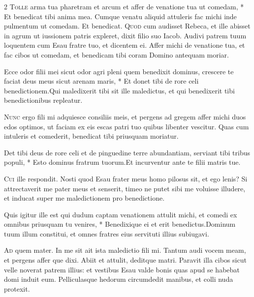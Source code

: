 \begin{multicols*}{2}
\lettrine[lines=2]{\zallmancaps \color{Red} T}{olle} \hypertarget{tolle-arma}{\label{tolle-arma}} arma tua pharetram et arcum et affer de venatione tua ut comedam, * Et benedicat tibi anima mea. \V Cumque venatu aliquid attuleris fac michi inde pulmentum ut comedam. Et benedicat.
\lettrine[lines=2]{\zallmancaps \color{Blue} Q}{uod} cum audisset Rebeca, et ille abisset in agrum ut iussionem patris expleret, dixit filio suo Iacob. Audivi patrem tuum loquentem cum Esau fratre tuo, et dicentem ei. Affer michi de venatione tua, et fac cibos ut comedam, et benedicam tibi coram Domino antequam moriar.
\begin{responsory}
{Ecce odor filii mei sicut odor agri pleni quem benedixit dominus, crescere te faciat deus meus sicut arenam maris, * Et donet tibi de rore celi benedictionem.}{Qui maledixerit tibi sit ille maledictus, et qui benedixerit tibi benedictionibus repleatur.}
\end{responsory}%
\lettrine[lines=2]{\zallmancaps \color{Red} N}{unc} ergo fili mi adquiesce consiliis meis, et pergens ad gregem affer michi duos edos optimos, ut faciam ex eis escas patri tuo quibus libenter vescitur. Quas cum intuleris et comederit, benedicat tibi priusquam moriatur.
\begin{responsory-doxology}
{Det tibi deus de rore celi et de pinguedine terre abundantiam, serviant tibi tribus populi, * Esto dominus fratrum tuorum.}{Et incurventur ante te filii matris tue.}
\end{responsory-doxology}%
\lettrine[lines=2]{\zallmancaps \color{Blue} C}{ui} ille respondit. Nosti quod Esau frater meus homo pilosus sit, et ego lenis? Si attrectaverit me pater meus et senserit, timeo ne putet sibi me voluisse illudere, et inducat super me maledictionem pro benedictione.
\begin{responsory}%
{Quis igitur ille est qui dudum captam venationem attulit michi, et comedi ex omnibus priusquam tu venires, * Benedixique ei et erit benedictus.}{Dominum tuum illum constitui, et omnes fratres eius servituti illius subiugavi.}
\end{responsory}%
\lettrine[lines=2]{\zallmancaps \color{Red} A}{d} quem mater. In me sit ait ista maledictio fili mi. Tantum audi vocem meam, et pergens affer que dixi. Abiit et attulit, deditque matri. Paravit illa cibos sicut velle noverat patrem illius: et vestibus Esau valde bonis quas apud se habebat domi induit eum. Pelliculasque hedorum circumdedit manibus, et colli nuda protexit.

\end{multicols*}
